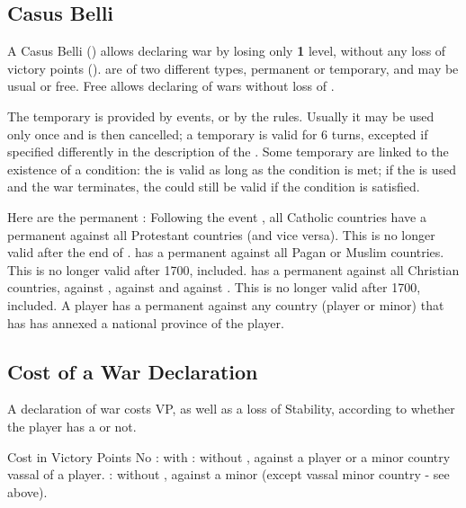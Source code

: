 


\subsection{Casus Belli}

\aparag A Casus Belli (\CB) allows declaring war by losing only {\bf 1} \STAB
level, without any loss of victory points (\VP). \CB are of two different
types, permanent or temporary, and may be usual or free. Free \CB allows
declaring of wars without loss of \STAB.

 The temporary \CB is provided by events, or by
the rules. Usually it may be used only once and is then cancelled; a temporary
\CB is valid for 6 turns, excepted if specified differently in the description
of the \CB. Some temporary \CB are linked to the existence of a condition: the
\CB is valid as long as the condition is met; if the \CB is used and the war
terminates, the \CB could still be valid if the condition is satisfied.

 Here are the permanent \CB:
\bparag Following the event , all Catholic countries
have a permanent \CB against all Protestant countries (and vice versa). This
is no longer valid after the end of .
\bparag \SPA has a permanent \CB against all Pagan or Muslim countries.  This
is no longer valid after 1700, included.
\bparag \TUR has a permanent \CB against all Christian countries, against
, against \paysEgypte and against \paysDamas. This is no longer
valid after 1700, included.
\bparag A player has a permanent \CB against any country (player or minor)
that has has annexed a national province of the player.



\subsection{Cost of a War Declaration}

\aparag A declaration of war costs VP, as well as a loss of Stability,
according to whether the player has a \CB or not.

\aparag Cost in Victory Points
\bparag No \VP: with \CB
{} \VP: without \CB, against a player or a minor country vassal of a
player.
 \VP: without \CB, against a minor (except vassal minor country -
see above).

